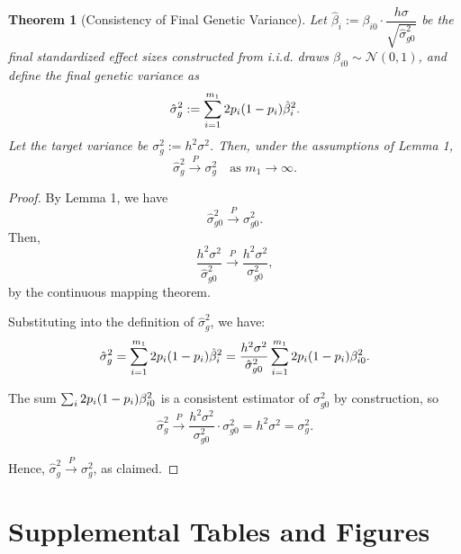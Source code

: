 \documentclass[11pt]{article}
\newtheorem{theorem}{Theorem}
\begin{document}
\begin{theorem}[Consistency of Final Genetic Variance]
Let \( \hat{\beta}_i := \beta_{i0} \cdot \dfrac{h\sigma}{\sqrt{\hat{\sigma}_{g0}^2}} \) be the final standardized effect sizes constructed from i.i.d. draws \( \beta_{i0} \sim \mathcal{N}(0, 1) \), and define the final genetic variance as
\[
\hat{\sigma}_g^2 := \sum_{i=1}^{m_1} 2 p_{i}  (1 -  p_{i}  ) \hat{\beta}_i^2.
\]
Let the target variance be \( \sigma_g^2 := h^2 \sigma^2 \). Then, under the assumptions of Lemma 1,
\[
\hat{\sigma}_g^2 \xrightarrow{P} \sigma_g^2 \quad \text{as } m_1 \to \infty.
\]
\end{theorem}

\begin{proof}
By Lemma 1, we have
\[
\hat{\sigma}_{g0}^2 \xrightarrow{P} \sigma_{g0}^2.
\]
Then,
\[
\frac{h^2 \sigma^2}{\hat{\sigma}_{g0}^2} \xrightarrow{P} \frac{h^2 \sigma^2}{\sigma_{g0}^2},
\]
by the continuous mapping theorem.

Substituting into the definition of \( \hat{\sigma}_g^2 \), we have:
\[
\hat{\sigma}_g^2 = \sum_{i=1}^{m_1} 2 p_{i}  (1 -  p_{i}  ) \hat{\beta}_i^2 = \frac{h^2 \sigma^2}{\hat{\sigma}_{g0}^2} \sum_{i=1}^{m_1} 2 p_{i}  (1 -  p_{i}  ) \beta_{i0}^2.
\]

The sum \( \sum_{i} 2 p_{i}  (1 -  p_{i}  ) \beta_{i0}^2 \) is a consistent estimator of \( \sigma_{g0}^2 \) by construction, so
\[
\hat{\sigma}_g^2 \xrightarrow{P} \frac{h^2 \sigma^2}{\sigma_{g0}^2} \cdot \sigma_{g0}^2 = h^2 \sigma^2 = \sigma_g^2.
\]

Hence, \( \hat{\sigma}_g^2 \xrightarrow{P} \sigma_g^2 \), as claimed.
\end{proof}



\section{Supplemental Tables and Figures}
\end{document}
